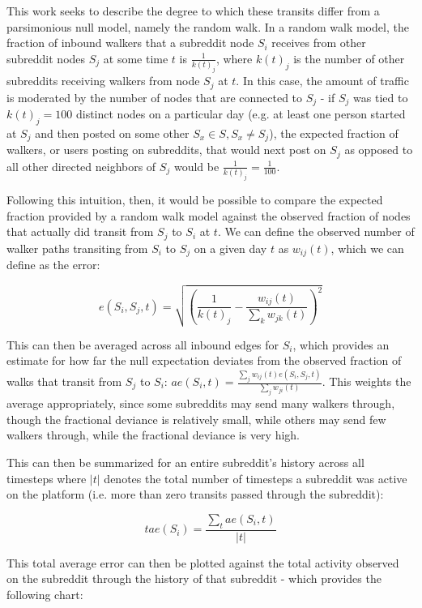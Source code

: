 \documentclass[letterpaper,12pt]{article}
\begin{document}
This work seeks to describe the degree to which these transits differ from a parsimonious null model, namely the random walk. In a random walk model, the fraction of inbound walkers that a subreddit node $S_i$ receives from other subreddit nodes $S_j$ at some time $t$ is $\frac{1}{k(t)_j}$, where $k(t)_j$ is the number of other subreddits receiving walkers from node $S_j$ at $t$. In this case, the amount of traffic is moderated by the number of nodes that are connected to $S_j$ - if $S_j$ was tied to $k(t)_j = 100$ distinct nodes on a particular day (e.g. at least one person started at $S_j$ and then posted on some other $S_x \in S, S_x \neq S_j$), the expected fraction of walkers, or users posting on subreddits, that would next post on $S_j$ as opposed to all other directed neighbors of $S_j$ would be $\frac{1}{k(t)_j} = \frac{1}{100}$.

Following this intuition, then, it would be possible to compare the expected fraction provided by a random walk model against the observed fraction of nodes that actually did transit from $S_j$ to $S_i$ at $t$. We can define the observed number of walker paths transiting from $S_i$ to $S_j$ on a given day $t$ as $w_{ij}(t)$, which we can define as the error: 

$$e(S_i, S_j, t) = \sqrt{(\frac{1}{k(t)_j} - \frac{w_{ij}(t)}{\sum_k w_{jk}(t)})^2}$$

This can then be averaged across all inbound edges for $S_i$, which provides an estimate for how far the null expectation deviates from the observed fraction of walks that transit from $S_j$ to $S_i$: $ae(S_i, t) = \frac{\sum_j w_{ij}(t) e(S_i, S_j, t)}{\sum_j w_{ji}(t)}$. This weights the average appropriately, since some subreddits may send many walkers through, though the fractional deviance is relatively small, while others may send few walkers through, while the fractional deviance is very high.

This can then be summarized for an entire subreddit's history across all timesteps where $|t|$ denotes the total number of timesteps a subreddit was active on the platform (i.e. more than zero transits passed through the subreddit):

$$tae(S_i) = \frac{\sum_t ae(S_i, t)}{|t|}$$

This total average error can then be plotted against the total activity observed on the subreddit through the history of that subreddit - which provides the following chart:
\end{document}
